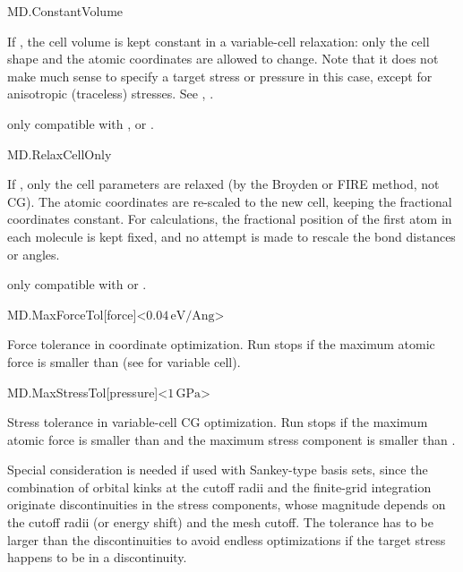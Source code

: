 \begin{fdflogicalF}{MD.ConstantVolume}

  If \fdftrue, the cell volume is kept constant in a variable-cell
  relaxation: only the cell shape and the atomic coordinates are
  allowed to change.  Note that it does not make much sense to specify
  a target stress or pressure in this case, except for anisotropic
  (traceless) stresses.  See ,
  .

  \note only compatible with  ,
   or .

\end{fdflogicalF}

\begin{fdflogicalF}{MD.RelaxCellOnly}

  If \fdftrue, only the cell parameters are relaxed (by the Broyden or
  FIRE method, not CG). The atomic coordinates are re-scaled to the
  new cell, keeping the fractional coordinates constant. For
   calculations, the fractional position of the first
  atom in each molecule is kept fixed, and no attempt is made to
  rescale the bond distances or angles.

  \note only compatible with   or .

\end{fdflogicalF}

\begin{fdfentry}{MD.MaxForceTol}[force]<$0.04\,\mathrm{eV/Ang}$>
  
  Force tolerance in coordinate optimization.
  Run stops if the maximum atomic force is
  smaller than  (see 
  for variable cell).

\end{fdfentry}

\begin{fdfentry}{MD.MaxStressTol}[pressure]<$1\,\mathrm{GPa}$>
  
  Stress tolerance in variable-cell CG optimization. Run stops if the
  maximum atomic force is smaller than  and the
  maximum stress component is smaller than .

  Special consideration is needed if used with Sankey-type basis sets,
  since the combination of orbital kinks at the cutoff radii and the
  finite-grid integration originate discontinuities in the stress
  components, whose magnitude depends on the cutoff radii (or energy
  shift) and the mesh cutoff. The tolerance has to be larger than the
  discontinuities to avoid endless optimizations if the target stress
  happens to be in a discontinuity.

\end{fdfentry}

